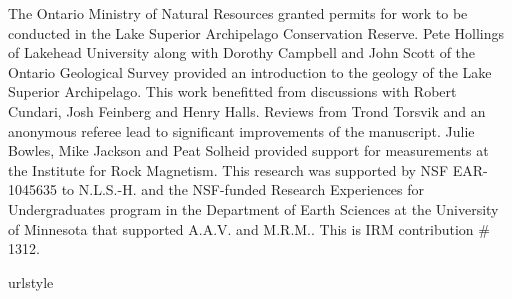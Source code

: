 \documentclass[draft,gc]{AGUTeX}
\begin{document}
\begin{article}
\begin{acknowledgments}
The Ontario Ministry of Natural Resources granted permits for work to be conducted in the Lake Superior Archipelago Conservation Reserve. Pete Hollings of Lakehead University along with Dorothy Campbell and John Scott of the Ontario Geological Survey provided an introduction to the geology of the Lake Superior Archipelago. This work benefitted from discussions with Robert Cundari, Josh Feinberg and Henry Halls. Reviews from Trond Torsvik and an anonymous referee lead to significant improvements of the manuscript. Julie Bowles, Mike Jackson and Peat Solheid provided support for measurements at the Institute for Rock Magnetism. This research was supported by NSF EAR-1045635 to N.L.S.-H. and the NSF-funded Research Experiences for Undergraduates program in the Department of Earth Sciences at the University of Minnesota that supported A.A.V. and M.R.M.. This is IRM contribution $\#$1312.

\end{acknowledgments}

%
%
%
%
%
%
%
%
%

%

\begin{thebibliography}{24}
\providecommand{\natexlab}[1]{#1}
\expandafter\ifx\csname urlstyle\endcsname\relax
  \providecommand{\doi}[1]{doi:\discretionary{}{}{}#1}\else
  \providecommand{\doi}{doi:\discretionary{}{}{}\begingroup
  \urlstyle{rm}\Url}\fi


\end{thebibliography}
\end{article}
\end{document}
